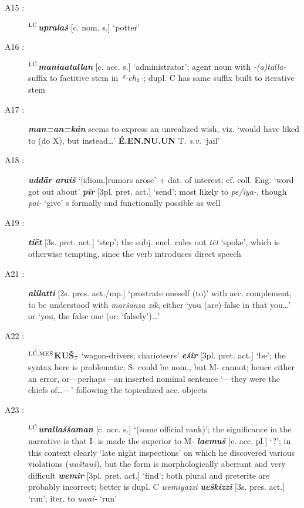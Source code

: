 \documentclass[10pt]{article}
\newcommand{\supersc}[1]{$^{\textrm{\scriptsize{#1}}}$}  	%
\newcommand{\subsc}[1]{$_{\textrm{\scriptsize{#1}}}$}	%
\newcommand{\bit}[1]{\textbf{\textit{#1}}}				%
\newcommand{\p}[1]{{\tiny[{#1}]}}					%
\newcommand{\hii}{h\subsc{2}}								%
\newcommand{\hith}{\textsubwedge{h}}
\newcommand{\man}{\supersc{L\'U}}
\newcommand{\men}{\supersc{L\'U.ME\v{S}}}
\renewcommand{\.}[1]{\textsubdot{#1}}
\begin{document}
\begin{description}
\item[A15 :] \textbf{\man}\bit{{\hith}uprala\v{s}} \p{c. nom. s.} `potter'

\item[A16 :] \textbf{\man}\bit{mania{\hith\hith}atallan} \p{c. acc. s.} `administrator'; agent noun with \textit{-(a)talla-} suffix to factitive stem in \textit{*-e{\hii}-}; dupl. C has same suffix built to iterative stem

\item[A17 :] \bit{man=an=k\'an} seems to express an unrealized wish, viz. `would have liked to (do X), but instead{\ldots}' \textbf{\'E.EN.NU.UN} T. \textit{s.v.} `jail'

\item[A18 :] \bit{udd\=ar arai\v{s}} `\p{idiom.}rumors arose' + dat. of interest; cf. coll. Eng. `word got out about' \bit{p\=ir} \p{3pl. pret. act.} `send'; most likely to \textit{pe/iya-}, though \textit{pai-} `give' s formally and functionally possible as well

\item[A19 :] \bit{ti\=et} \p{3s. pret. act.} `step'; the subj. encl. rules out \textit{t\=et} `spoke', which is otherwise tempting, since the verb introduces direct speech

\item[A21 :] \bit{{\hith}ali{\hith}latti} \p{2s. pres. act./mp.} `prostrate oneself (to)' with acc. complement; to be understood with \textit{mar\v{s}anza zik}, either `you (are) false in that you{\ldots}' or `you, the false one (or: `falsely')\ldots'

\item[A22 :] \textbf{{\men}KU\v{S}\subsc{7}} `wagon-drivers; charioteers' \bit{e\v{s}ir} \p{3pl. pret. act.} `be'; the syntax here is problematic; S- could be nom., but M- cannot; hence either an error, or---perhaps---an inserted nominal sentence `---they were the chiefs of{\ldots}---' following the topicalized acc. objects

\item[A23 :] \textbf{\man}\bit{uralla\v{s}\v{s}aman} \p{c. acc. s.} `(some official rank)'; the significance in the narrative is that I- is made the superior to M- \bit{la{\hith\hith}emu\v{s}} \p{c. acc. pl.} `?'; in this context clearly `late night inspections' on which he discovered various violations (\textit{wa\v{s}tau\v{s}}), but the form is morphologically aberrant and very difficult \bit{wemir} \p{3pl. pret. act.} `find'; both plural and preterite are probably incorrect; better is dupl. C \textit{wemiyazzi} \bit{{\hith}ue\v{s}kizzi} \p{3s. pres. act.} `run'; iter. to \textit{{\hith}uwai-} `run' 


\end{description}
\end{document}
